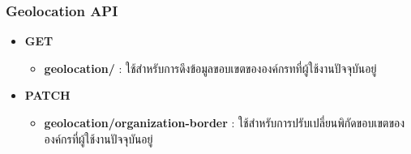 \subsubsection{Geolocation API}

\ifenglish
\else
\begin{itemize}
    \item \textbf{GET}
    \begin{itemize}
        \item \textbf{geolocation/} : ใช้สำหรับการดึงข้อมูลขอบเขตขององค์กรทที่ผู้ใช้งานปัจจุบันอยู่
    \end{itemize}
    \item \textbf{PATCH}
    \begin{itemize}
        \item \textbf{geolocation/organization-border} : ใช้สำหรับการปรับเปลี่ยนพิกัดขอบเขตขององค์กรที่ผู้ใช้งานปัจจุบันอยู่
    \end{itemize}
\end{itemize}
\fi